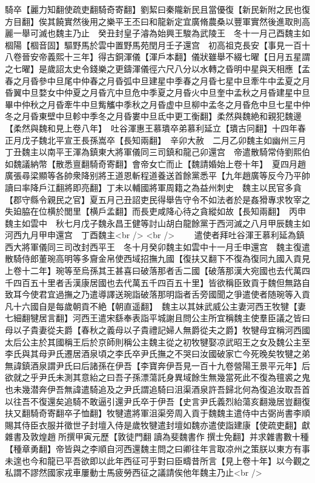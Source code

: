 騎卒【麗力知翻使疏吏翻騎奇寄翻】劉絜曰秦隴新民且當優復【新民新附之民也復方目翻】俟其饒實然後用之樂平王丕曰和龍新定宜廣脩農桑以豐軍實然後進取則高麗一舉可滅也魏主乃止　癸丑封皇子濬為始興王駿為武陵王　冬十一月己酉魏主如棝陽【棝音固】驅野馬於雲中置野馬苑閏月壬子還宫　初高祖克長安【事見一百十八卷晉安帝義熙十三年】得古銅渾儀【渾戶本翻】儀狀雖舉不綴七曜【日月五星謂之七曜】是歲詔太史令錢樂之更鑄渾儀徑六尺八分以水轉之昏明中星與天相應【孟春之月昏參中旦尾中仲春之月昏弧中旦建星中季春之月昏七星中旦牽牛中孟夏之月昏翼中旦婺女中仲夏之月昏亢中旦危中季夏之月昏火中旦奎中孟秋之月昏建星中旦畢中仲秋之月昏牽牛中旦觜觿中季秋之月昏虚中旦柳中孟冬之月昏危中旦七星中仲冬之月昏東壁中旦軫中季冬之月昏婁中旦氐中更工衡翻】柔然與魏絶和親犯魏邊【柔然與魏和見上卷八年】　吐谷渾惠王慕璝卒弟慕利延立【璝古冋翻】十四年春正月戊子魏北平宣王長孫嵩卒【長知兩翻】　辛卯大赦　二月乙卯魏主如幽州三月丁丑魏主以南平王渾為鎮東大將軍儀同三司鎮和龍己卯還宫　帝遣散騎常侍劉熙伯如魏議納幣【散悉亶翻騎奇寄翻】會帝女亡而止【魏請婚始上卷十年】　夏四月趙廣張尋梁顯等各帥衆降别將王道恩斬程道養送首餘黨悉平【九年趙廣等反今乃平帥讀曰率降戶江翻將即亮翻】丁未以輔國將軍周籍之為益州刺史　魏主以民官多貪【郡守縣令親民之官】夏五月己丑詔吏民得舉告守令不如法者於是姦猾專求牧宰之失廹脇在位横於閭里【横戶孟翻】而長吏咸降心待之貪縱如故【長知兩翻】　丙申魏主如雲中　秋七月戊子魏永昌王健等討山胡白龍餘黨于西河滅之八月甲辰魏主如河西九月甲申還宫　丁酉魏主<br />
<br />
　　遣使者拜吐谷渾王慕利延為鎮西大將軍儀同三司改封西平王　冬十月癸卯魏主如雲中十一月壬申還宫　魏主復遣散騎侍郎董琬高明等多齎金帛使西域招撫九國【復扶又翻下不復為復同九國入貢見上卷十二年】琬等至烏孫其王甚喜曰破落那者舌二國【破落那漢大宛國也去代萬四千四百五十里者舌漢康居國也去代萬五千四百五十里】皆欲稱臣致貢于魏但無路自致耳今使君宜過撫之乃遣導譯送琬詣破落那明詣者舌旁國聞之爭遣使者随琬等入貢凡十六國自是每歲朝貢不絶【朝直遥翻】　魏主以其妹武威公主妻河西王牧犍【妻七細翻犍居言翻】河西王遣宋繇奉表詣平城謝且問公主所宜稱魏主使羣臣議之皆曰母以子貴妻從夫爵【春秋之義母以子貴禮記婦人無爵從夫之爵】牧犍母宜稱河西國太后公主於其國稱王后於京師則稱公主魏主從之初牧犍娶凉武昭王之女及魏公主至李氏與其母尹氏遷居酒泉頃之李氏卒尹氏撫之不哭曰汝國破家亡今死晚矣牧犍之弟無諱鎮酒泉謂尹氏曰后諸孫在伊吾【李寶奔伊吾見一百十九卷營陽王景平元年】后欲就之乎尹氏未測其意紿之曰吾子孫漂蕩託身異域餘生無幾當死此不復為氊裘之鬼也未幾潜奔伊吾無諱遣騎追及之尹氏謂追騎曰沮渠酒泉許吾歸北何為復追汝取吾首以往吾不復還矣追騎不敢逼引還尹氏卒于伊吾【史言尹氏義烈紿蕩亥翻幾居豈翻復扶又翻騎奇寄翻卒子恤翻】牧犍遣將軍沮渠旁周入貢于魏魏主遣侍中古弼尚書李順賜其侍臣衣服并徵世子封壇入侍是歲牧犍遣封壇如魏亦遣使詣建康【使疏吏翻】獻雜書及敦煌趙所撰甲寅元歷【敦徒門翻讀為斐魏書作撰士免翻】并求雜書數十種【種章勇翻】帝皆與之李順自河西還魏主問之曰卿往年言取凉州之策朕以東方有事未遑也今和龍已平吾欲即以此年西征可乎對曰臣疇昔所言【見上卷十年】以今觀之私謂不謬然國家戎車屢動士馬疲勞西征之議請俟他年魏主乃止<br />
